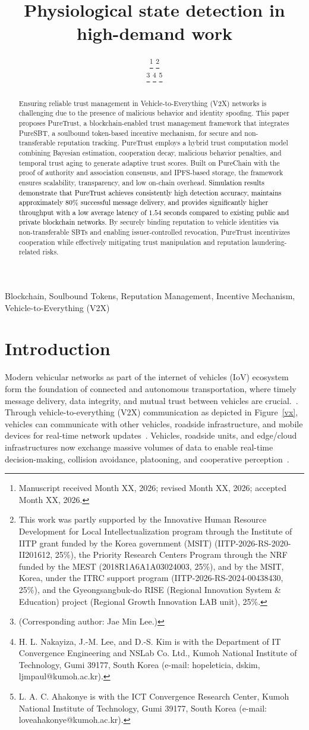 \cite{cho2010survey}\documentclass[journal,comsoc,twoside]{IEEEtran}
\title{Physiological state detection in high-demand work}
\author{\IEEEauthorblockN{Hope Leticia Nakayiza\orcidlink{https://orcid.org/0009-0001-0570-845X}, \textit{Member, IEEE}, Love Allen Chijioke Ahakonye\orcidlink{0000-0003-2840-1693}, \textit{Member, IEEE}, \\ Dong-Seong Kim, \orcidlink{0000-0002-2977-5964}, \textit{Senior Member, IEEE}, \textit{Member, IEEE}, Jae Min Lee\orcidlink{0000-0001-6885-5185}, \textit{Member, IEEE}}
    
\thanks{Manuscript received Month XX, 2026; revised Month XX, 2026; accepted Month XX, 2026.}
\thanks{This work was partly supported by the Innovative Human Resource Development for Local Intellectualization program through the Institute of IITP grant funded by the Korea government (MSIT) (IITP-2026-RS-2020-II201612, 25\%), the Priority Research Centers Program through the NRF funded by the MEST (2018R1A6A1A03024003, 25\%), and by the MSIT, Korea, under the ITRC support program (IITP-2026-RS-2024-00438430, 25\%), and the Gyeongsangbuk-do RISE (Regional Innovation System \& Education) project (Regional Growth Innovation LAB unit), 25\%.}%

\thanks{(Corresponding author: Jae Min Lee.)}
\thanks{H. L. Nakayiza, J.-M. Lee, and D.-S. Kim is with the Department of IT Convergence Engineering and NSLab Co. Ltd., Kumoh National Institute of Technology, Gumi 39177, South Korea (e-mail: {hopeleticia, dskim, ljmpaul}@kumoh.ac.kr).}%
\thanks{L. A. C. Ahakonye is with the ICT Convergence Research Center, Kumoh National Institute of Technology, Gumi 39177, South Korea (e-mail: loveahakonye@kumoh.ac.kr).}%
}
\begin{document}
\maketitle



\begin{abstract}


Ensuring reliable trust management in Vehicle-to-Everything (V2X) networks is challenging due to the presence of malicious behavior and identity spoofing. This paper proposes PureTrust, a blockchain-enabled trust management framework that integrates PureSBT, a soulbound token-based incentive mechanism, for secure and non-transferable reputation tracking. PureTrust employs a hybrid trust computation model combining Bayesian estimation, cooperation decay, malicious behavior penalties, and temporal trust aging to generate adaptive trust scores. Built on PureChain with the proof of authority and association consensus, and IPFS-based storage, the framework ensures scalability, transparency, and low on-chain overhead.
\textcolor{black}{Simulation results demonstrate that PureTrust achieves consistently high detection accuracy, maintains approximately 80\% successful message delivery, and provides significantly higher throughput with a low average latency of $1.54$ seconds compared to existing public and private blockchain networks.} By securely binding reputation to vehicle identities via non-transferable SBTs and enabling issuer-controlled revocation, PureTrust incentivizes cooperation while effectively mitigating trust manipulation and reputation laundering-related risks.
\end{abstract}

\begin{IEEEkeywords}
Blockchain, Soulbound Tokens, Reputation Management, Incentive Mechanism, Vehicle-to-Everything (V2X)
\end{IEEEkeywords}

\section{Introduction}
\label{int}

Modern vehicular networks as part of the internet of vehicles (IoV) ecosystem form the foundation of connected and autonomous transportation, where timely message delivery, data integrity, and mutual trust between vehicles are crucial.~\cite{sehar}. Through vehicle-to-everything (V2X) communication as depicted in Figure~\ref{vx}, vehicles can communicate with other vehicles, roadside infrastructure, and mobile devices for real-time network updates~\cite{MENDES}. Vehicles, roadside units, and edge/cloud infrastructures now exchange massive volumes of data to enable real-time decision-making, collision avoidance, platooning, and cooperative perception~\cite{Leticia}. 
\end{document}
